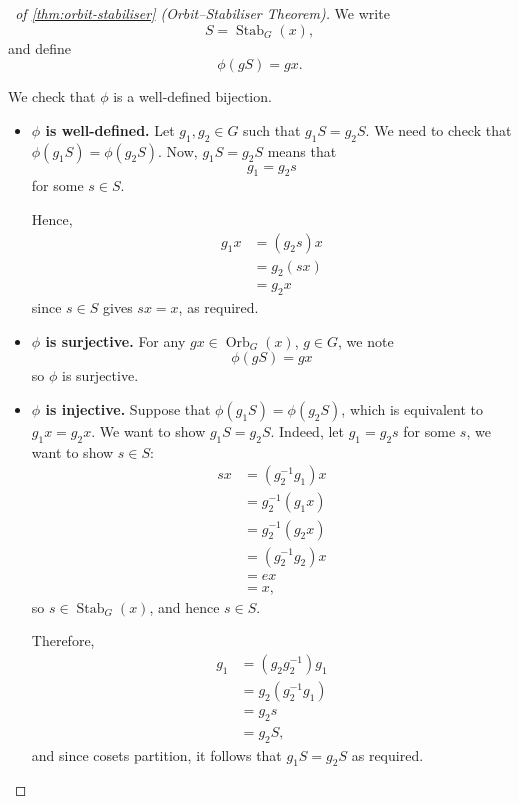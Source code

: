 \documentclass{article}
\theoremstyle{definition}
\theoremstyle{remark}
\newcommand{\pqty}[1]{\left(#1\right)}
\newcommand{\inverse}{^{-1}}
\newcommand{\Stab}{\operatorname{Stab}}
\newcommand{\Orb}{\operatorname{Orb}}
\begin{document}
\begin{proof}[\proofname\ of \autoref{thm:orbit-stabiliser} (Orbit--Stabiliser Theorem)]
    We write
    \[
        S = \Stab_{G} \pqty{x},
    \]
    and define
    \[
        \phi \pqty{gS} = gx.
    \]

    We check that \(\phi\) is a well-defined bijection.

    \begin{itemize}
        \item \textbf{\(\phi\) is well-defined.} Let \(g_1, g_2 \in G\) such that \(g_1 S = g_2 S\). We need to check that \(\phi\pqty{g_1 S} = \phi\pqty{g_2 S}\). Now, \(g_1 S = g_2 S\) means that
        \[
            g_1 = g_2 s
        \]
        for some \(s \in S\).

        Hence,
        \begin{align*}
            g_1 x &= \pqty{g_2 s} x \\
            &= g_2 \pqty{sx} \\
            &= g_2 x
        \end{align*}
        since \(s \in S\) gives \(sx = x\), as required.

        \item \textbf{\(\phi\) is surjective.} For any \(gx \in \Orb_{G} \pqty{x}\), \(g \in G\), we note
        \[
            \phi\pqty{gS} = gx
        \]
        so \(\phi\) is surjective.

        \item \textbf{\(\phi\) is injective.} Suppose that \(\phi\pqty{g_1 S} = \phi\pqty{g_2 S}\), which is equivalent to \(g_1 x = g_2 x\). We want to show \(g_1 S = g_2 S\). Indeed, let \(g_1 = g_2 s\) for some \(s\), we want to show \(s \in S\):
        \begin{align*}
            sx &= \pqty{g_2 \inverse g_1} x \\
            &= g_2 \inverse \pqty{g_1 x} \\
            &= g_2 \inverse \pqty{g_2 x} \\
            &= \pqty{g_2 \inverse g_2} x \\
            &= ex \\
            &= x,
        \end{align*}
        so \(s \in \Stab_{G} \pqty{x}\), and hence \(s \in S\).

        Therefore,
        \begin{align*}
            g_1 &= \pqty{g_2 g_2\inverse} g_1 \\
            &= g_2 \pqty{g_2\inverse g_1} \\
            &= g_2 s \\
            &= g_2 S,
        \end{align*}
        and since cosets partition, it follows that \(g_1 S = g_2 S\) as required.
    \end{itemize}
\end{proof}
\end{document}
